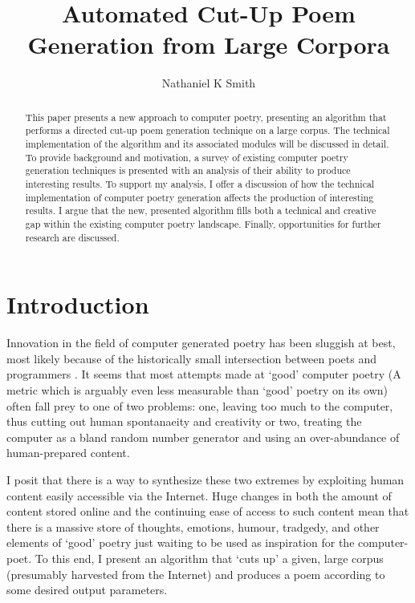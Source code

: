 \documentclass[10pt]{article}
\title{Automated Cut-Up Poem Generation from Large Corpora}
\author{Nathaniel K Smith}
\begin{document}
\maketitle

\begin{abstract}
This paper presents a new approach to computer poetry, presenting an algorithm
that performs a directed cut-up poem generation technique on a large corpus. The
technical implementation of the algorithm and its associated modules will be
discussed in detail. To provide background and motivation, a survey of existing
computer poetry generation techniques is presented with an analysis of their
ability to produce interesting results. To support my analysis, I offer a
discussion of how the technical implementation of computer poetry generation
affects the production of interesting results. I argue that the new, presented
algorithm fills both a technical and creative gap within the existing computer
poetry landscape. Finally, opportunities for further research are discussed.
\end{abstract}

\tableofcontents
\doublespacing

\section{Introduction}
Innovation in the field of computer generated poetry has been sluggish at best,
most likely because of the historically small intersection between poets and
programmers \cite{Hart96}. It seems that most attempts made at `good' computer
poetry (A metric which is arguably even less measurable than `good' poetry on
its own) often fall prey to one of two problems: one, leaving too much to the
computer, thus cutting out human spontanaeity and creativity or two, treating
the computer as a bland random number generator and using an over-abundance of
human-prepared content.

I posit that there is a way to synthesize these two extremes by exploiting
human content easily accessible via the Internet. Huge changes in both the
amount of content stored online and the continuing ease of access to such
content mean that there is a massive store of thoughts, emotions, humour,
tradgedy, and other elements of `good' poetry just waiting to be used as
inspiration for the computer-poet. To this end, I present an algorithm that
`cuts up' a given, large corpus (presumably harvested from the Internet) and
produces a poem according to some desired output parameters.
\end{document}

